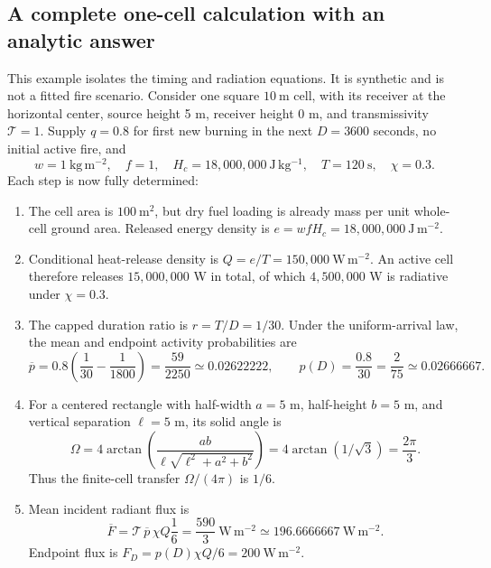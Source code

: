 \documentclass[11pt,a4paper]{article}
\begin{document}
\subsection{A complete one-cell calculation with an analytic answer}
This example isolates the timing and radiation equations. It is synthetic and
is not a fitted fire scenario. Consider one square $10\ \mathrm m$ cell,
with its receiver at the horizontal center, source height 5 m, receiver height
0 m, and transmissivity $\mathcal T=1$. Supply $q=0.8$ for first new burning
in the next $D=3600$ seconds, no initial active fire, and
\begin{equation}
w=1\ \mathrm{kg\,m^{-2}},\quad f=1,\quad
H_c=18{,}000{,}000\ \mathrm{J\,kg^{-1}},\quad
T=120\ \mathrm s,\quad\chi=0.3.
\end{equation}
Each step is now fully determined:
\begin{enumerate}
\item The cell area is $100\ \mathrm{m^2}$, but dry fuel loading is already
mass per unit whole-cell ground area. Released energy density is
$e=w f H_c=18{,}000{,}000\ \mathrm{J\,m^{-2}}$.
\item Conditional heat-release density is $Q=e/T=150{,}000\ \mathrm{W\,m^{-2}}$.
An active cell therefore releases $15{,}000{,}000$ W in total, of which
$4{,}500{,}000$ W is radiative under $\chi=0.3$.
\item The capped duration ratio is $r=T/D=1/30$. Under the uniform-arrival
law, the mean and endpoint activity probabilities are
\begin{equation}
\overline p=0.8\left(\frac1{30}-\frac1{1800}\right)
=\frac{59}{2250}\simeq0.02622222,
\qquad p(D)=\frac{0.8}{30}=\frac2{75}\simeq0.02666667.
\end{equation}
\item For a centered rectangle with half-width $a=5$ m, half-height $b=5$ m,
and vertical separation $\ell=5$ m, its solid angle is
\begin{equation}
\Omega=4\arctan\left(\frac{ab}{\ell\sqrt{\ell^2+a^2+b^2}}\right)
=4\arctan(1/\sqrt3)=\frac{2\pi}{3}.
\end{equation}
Thus the finite-cell transfer $\Omega/(4\pi)$ is $1/6$.
\item Mean incident radiant flux is
\begin{equation}
\overline F=\mathcal T\,\overline p\,\chi Q\frac16
=\frac{590}{3}\ \mathrm{W\,m^{-2}}
\simeq196.6666667\ \mathrm{W\,m^{-2}}.
\end{equation}
Endpoint flux is $F_D=p(D)\chi Q/6=200\ \mathrm{W\,m^{-2}}$.

\end{enumerate}
\end{document}
